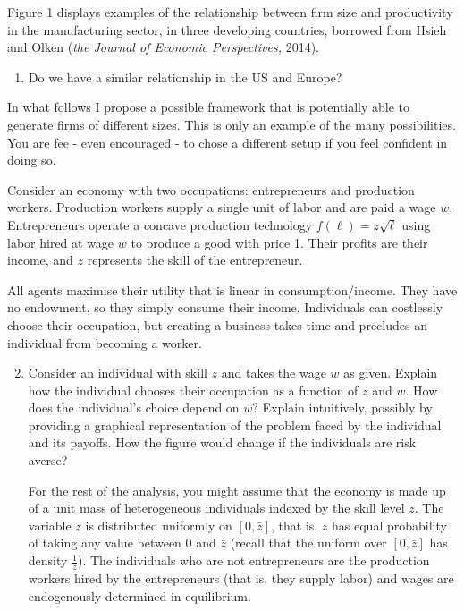 \documentclass[11pt,a4paper]{article}
\begin{document}
Figure 1 displays examples of the relationship between firm size and productivity in the manufacturing sector, in three developing countries, borrowed from Hsieh and Olken (\emph{the Journal of Economic Perspectives,} 2014).

\begin{enumerate}
    \item Do we have a similar relationship in the US and Europe?
\end{enumerate}

In what follows I propose a possible framework that is potentially able to generate firms of different sizes. This is only an example of the many possibilities. You are fee - even encouraged - to chose a different setup if you feel confident in doing so.

Consider an economy with two occupations: entrepreneurs and production workers. Production workers supply a single unit of labor and are paid a wage $w$. Entrepreneurs operate a concave production technology $f(\ell) = z\sqrt{\ell}$ using labor hired at wage $w$ to produce a good with price 1. Their profits are their income, and $z$ represents the skill of the entrepreneur.

All agents maximise their utility that is linear in consumption/income. They have no endowment, so they simply consume their income. Individuals can costlessly choose their occupation, but creating a business takes time and precludes an individual from becoming a worker.

\begin{enumerate}
    \setcounter{enumi}{1}
    \item Consider an individual with skill $z$ and takes the wage $w$ as given. Explain how the individual chooses their occupation as a function of $z$ and $w$. How does the individual's choice depend on $w$? Explain intuitively, possibly by providing a graphical representation of the problem faced by the individual and its payoffs. How the figure would change if the individuals are risk averse?

    For the rest of the analysis, you might assume that the economy is made up of a unit mass of heterogeneous individuals indexed by the skill level $z$. The variable $z$ is distributed uniformly on $[0,\bar{z}]$, that is, $z$ has equal probability of taking any value between 0 and $\bar{z}$ (recall that the uniform over $[0,\bar{z}]$ has density $\frac{1}{\bar{z}}$). The individuals who are not entrepreneurs are the production workers hired by the entrepreneurs (that is, they supply labor) and wages are endogenously determined in equilibrium.
\end{enumerate}
\end{document}
